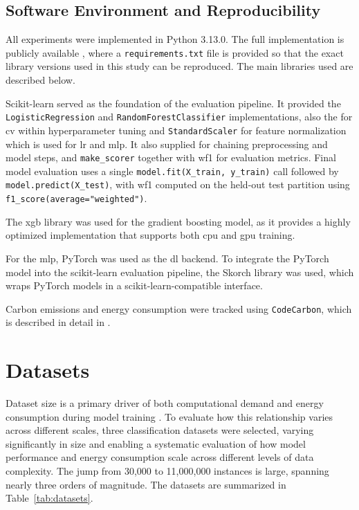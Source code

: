 \subsection{Software Environment and Reproducibility}
\label{implementation_sw_env}

All experiments were implemented in Python 3.13.0. The full implementation is  publicly available \cite{BThesisQorri}, where a \texttt{requirements.txt} file is provided so that the exact library versions used in this study can be reproduced. The main libraries used are described below.

Scikit-learn served as the foundation of the evaluation pipeline. It provided the \texttt{LogisticRegression} and \texttt{RandomForestClassifier} implementations, also the  for \gls{cv} within hyperparameter tuning and \texttt{StandardScaler} for feature normalization which is used for \gls{lr} and \gls{mlp}. It also supplied  for chaining preprocessing and model steps, and \texttt{make\_scorer} together with \gls{wf1} for evaluation metrics. Final model evaluation uses a single \texttt{model.fit(X\_train, y\_train)} call followed by \texttt{model.predict(X\_test)}, with \gls{wf1} computed on the held-out test partition using \texttt{f1\_score(average="weighted")}.

The \gls{xgb} library was used for the gradient boosting model, as it provides a highly optimized implementation that supports both \gls{cpu} and \gls{gpu} training.

For the \gls{mlp}, PyTorch \cite{paszkePyTorchImperativeStyle2019} was used as the \gls{dl} backend. To integrate the PyTorch model into the scikit-learn evaluation pipeline, the Skorch library \cite{ghoshSkorchBridgePyTorch2024} was used, which wraps PyTorch models in a scikit-learn-compatible interface.

Carbon emissions and energy consumption were tracked using \texttt{CodeCarbon}, which is described in detail in .


\section{Datasets}
\label{experimental_dataset}
Dataset size is a primary driver of both computational demand and energy consumption during model training \cite{rodriguezEvaluatingEnergyConsumption2024}. To evaluate how this relationship varies across different scales, three classification datasets were selected, varying significantly in size and enabling a systematic evaluation of how model performance and energy consumption scale across different levels of data complexity. The jump from 30,000 to 11,000,000 instances is large, spanning nearly three orders of magnitude. The datasets are summarized in Table~\ref{tab:datasets}.


